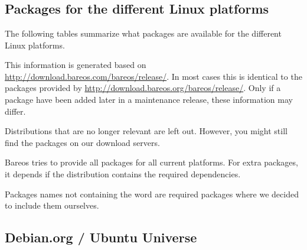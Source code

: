 % 

\section{}

\subsection{Packages for the different Linux platforms}
\label{sec:packages}

The following tables summarize what packages are available for the different Linux platforms.

This information is generated based on \url{http://download.bareos.com/bareos/release/}.
In most cases this is identical to the packages provided by \url{http://download.bareos.org/bareos/release/}.
Only if a package have been added later in a maintenance release, these information may differ.

Distributions that are no longer relevant are left out.
However, you might still find the packages on our download servers.

Bareos tries to provide all packages for all current platforms.
For extra packages, it depends if the distribution contains the required dependencies.

Packages names not containing the word  are required packages where we decided to include them ourselves.

{
    \small
    
    
    
    
    
}






\subsection{Debian.org / Ubuntu Universe}
\label{sec:DebianOrg}

